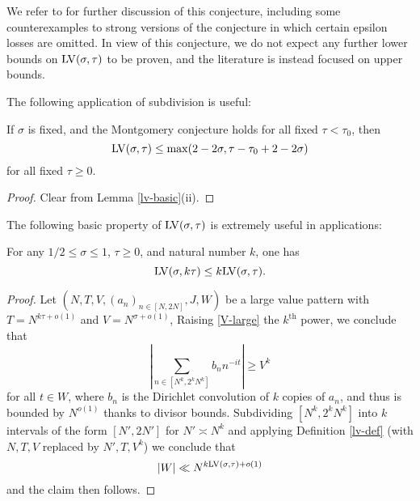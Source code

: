
We refer to \cite{bourgain_montgomery_1991} for further discussion of this conjecture, including some counterexamples to strong versions of the conjecture in which certain epsilon losses are omitted.  In view of this conjecture, we do not expect any further lower bounds on $\mathrm{LV}(\sigma,\tau)$ to be proven, and the literature is instead focused on upper bounds.

The following application of subdivision is useful:

\begin{lemma}\label{montgomery-subdivide}  If $\sigma$ is fixed, and the Montgomery conjecture holds for all fixed $\tau < \tau_0$, then
\begin{equation}\label{lvt-opt}
    \mathrm{LV}(\sigma, \tau) \leq \max( 2 - 2 \sigma, \tau - \tau_0 + 2 - 2\sigma)
\end{equation}
for all fixed $\tau \geq 0$.
\end{lemma}

\begin{proof}
Clear from Lemma \ref{lv-basic}(ii).
\end{proof}


The following basic property of $\mathrm{LV}(\sigma,\tau)$ is extremely useful in applications:

\begin{lemma}\label{power-lemma}  For any $1/2 \leq \sigma \leq 1$, $\tau \geq 0$, and natural number $k$, one has
    $$ \mathrm{LV}(\sigma, k\tau) \leq k \mathrm{LV}(\sigma, \tau).$$
\end{lemma}


\begin{proof} Let  $(N,T,V,(a_n)_{n \in [N,2N]},J,W)$ be a large value pattern with $T = N^{k\tau+o(1)}$ and $V = N^{\sigma+o(1)}$, Raising \eqref{V-large} the $k^{\mathrm{th}}$ power, we conclude that
$$ \left|\sum_{n \in [N^k,2^kN^k]} b_n n^{-it} \right| \geq V^k$$
for all $t \in W$, where $b_n$ is the Dirichlet convolution of $k$ copies of $a_n$, and thus is bounded by $N^{o(1)}$ thanks to divisor bounds.  Subdividing $[N^k, 2^k N^k]$ into $k$ intervals of the form $[N',2N']$ for $N' \asymp N^k$ and applying Definition \ref{lv-def} (with $N, T, V$ replaced by $N', T, V^k$) we conclude that
$$ |W| \ll N^{k \mathrm{LV}(\sigma,\tau) + o(1)}$$
and the claim then follows.
\end{proof}

